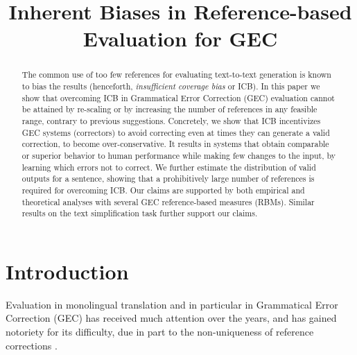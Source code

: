 \documentclass[a4paper, 11pt]{article}
\begin{document}
\title{Inherent Biases in Reference-based Evaluation for GEC}
\maketitle

	\begin{abstract}
		The common use of too few references for evaluating text-to-text
		generation is known to bias the results (henceforth, {\it insufficient
			coverage bias} or ICB). In this paper we show that overcoming ICB in
		Grammatical Error Correction (GEC) evaluation cannot be attained by
		re-scaling or by increasing the number of references in any feasible
		range, contrary to previous suggestions.
		Concretely, we show that ICB incentivizes GEC systems (correctors) to avoid correcting even at times they can generate a valid correction, to become over-conservative. It results in systems that obtain comparable or
		superior behavior to human performance while making few changes to the
		input, by learning which errors not to correct.
		We further estimate the distribution of valid outputs for a sentence,
		showing that a prohibitively large number of references is required
		for overcoming ICB. Our claims are supported by both empirical and
		theoretical analyses with several GEC reference-based measures (RBMs).
		Similar results on the text simplification task further support our claims.
	\end{abstract}
	
	\section{Introduction}
	
	Evaluation in monolingual translation \cite{xu2015problems,inderjeet2009summarization} and
	in particular in Grammatical Error Correction (GEC)
	\cite{tetreault2008native,madnani2011they,felice2015towards,bryant2015far,napoles2015ground}
	has received much attention over the years, and has gained notoriety for its difficulty,
	due in part to the non-uniqueness of reference corrections \cite{chodorow2012problems}.
	
\end{document}
